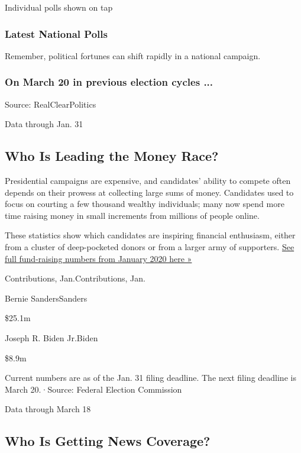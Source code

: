 Individual polls shown on tap

\hypertarget{latest-national-polls}{%
\subsubsection{Latest National Polls}\label{latest-national-polls}}

Remember, political fortunes can shift rapidly in a national campaign.

\hypertarget{on-march-20-in-previous-election-cycles-}{%
\subsubsection{On March 20 in previous election cycles
...}\label{on-march-20-in-previous-election-cycles-}}

Source: RealClearPolitics

Data through Jan. 31

\hypertarget{who-is-leading-the-money-race}{%
\subsection{Who Is Leading the Money
Race?}\label{who-is-leading-the-money-race}}

Presidential campaigns are expensive, and candidates' ability to compete
often depends on their prowess at collecting large sums of money.
Candidates used to focus on courting a few thousand wealthy individuals;
many now spend more time raising money in small increments from millions
of people online.

These statistics show which candidates are inspiring financial
enthusiasm, either from a cluster of deep-pocketed donors or from a
larger army of supporters.
\href{https://www.nytimes.com/interactive/2020/02/21/us/politics/democratic-fundraising-numbers-february.html}{See
full fund-raising numbers from January 2020 here »}

Contributions, Jan.Contributions, Jan.

Bernie SandersSanders

\$25.1m

Joseph R. Biden Jr.Biden

\$8.9m

Current numbers are as of the Jan. 31 filing deadline. The next filing
deadline is March 20.·Source: Federal Election Commission

Data through March 18

\hypertarget{who-is-getting-news-coverage}{%
\subsection{Who Is Getting News
Coverage?}\label{who-is-getting-news-coverage}}

